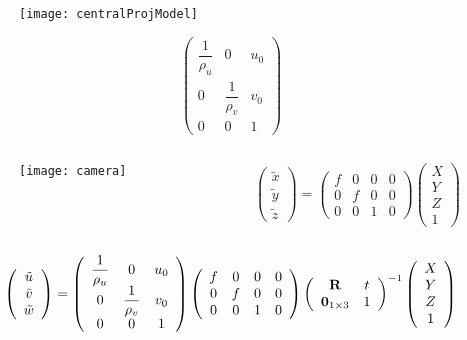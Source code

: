 \begin{frame}
\begin{figure}[!h]
\centering
\texttt{[image: centralProjModel]}
\end{figure}
\[
\left (
\begin{array}{ccc}
\dfrac{1}{\rho_u} & 0 & u_{0} \\
0 & \dfrac{1}{\rho_v} & v_{0} \\
0 & 0 & 1
\end{array}
\right )
\]
\end{frame}

\begin{frame}
\begin{columns}
\begin{column}{.5\textwidth}
\begin{figure}[!h]
\centering
\texttt{[image: camera]}
\end{figure}
\end{column}
\begin{column}{.5\textwidth}
\[
\left (
\begin{array}{c}
\tilde{x}\\
\tilde{y}\\
\tilde{z}
\end{array}
\right )
=
\left (
\begin{array}{cccc}
f & 0 & 0 & 0 \\
0 & f & 0 & 0 \\
0 & 0 & 1 & 0
\end{array}
\right )
\left (
\begin{array}{c}
X \\
Y \\
Z \\
1
\end{array}
\right )
\]
\end{column}
\end{columns}
\[
\left (
\begin{array}{c}
\tilde{u} \\
\tilde{v} \\
\tilde{w}
\end{array}
\right )
=
\left (
\begin{array}{ccc}
\dfrac{1}{\rho_u} & 0 & u_{0} \\
0 & \dfrac{1}{\rho_v} & v_{0} \\
0 & 0 & 1
\end{array}
\right )
\left (
\begin{array}{cccc}
f & 0 & 0 & 0 \\
0 & f & 0 & 0 \\
0 & 0 & 1 & 0
\end{array}
\right )
\left (
\begin{array}{cc}
\textbf{\text{R}} & t \\
\textbf{\text{0}}_{1\times 3} & 1
\end{array}
\right )^{-1}
\left (
\begin{array}{c}
X \\
Y \\
Z \\
1
\end{array}
\right )
\]
\end{frame}

